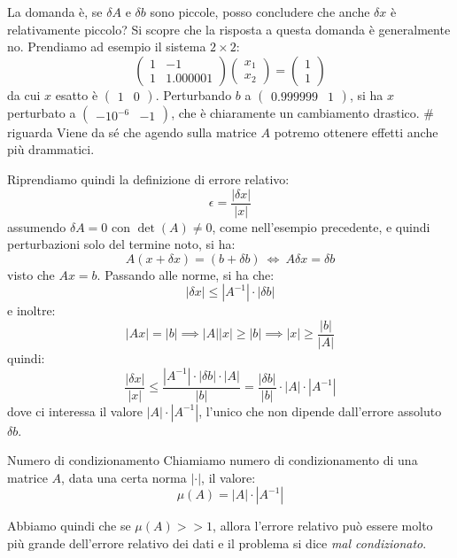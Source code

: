 \documentclass[a4paper,11pt]{article}
\begin{document}
La domanda è, se $\delta A$ e $\delta b$ sono piccole, posso concludere che anche $\delta x$ è relativamente piccolo?
Si scopre che la risposta a questa domanda è generalmente no.
Prendiamo ad esempio il sistema $2 \times 2$:
$$
\begin{pmatrix}
	1 & -1 \\
	1 & 1.000001
\end{pmatrix}
\begin{pmatrix}
	x_1 \\ x_2
\end{pmatrix}
=
\begin{pmatrix}
	1 \\ 1
\end{pmatrix}
$$
da cui $x$ esatto è $\begin{pmatrix}
	1 & 0
\end{pmatrix}$.
Perturbando $b$ a $\begin{pmatrix}
	0.999999 & 1
\end{pmatrix}$, si ha $x$ perturbato a $\begin{pmatrix}
	-10^{-6} & -1
\end{pmatrix}$, che è chiaramente un cambiamento drastico. # riguarda
Viene da sé che agendo sulla matrice $A$ potremo ottenere effetti anche più drammatici.

Riprendiamo quindi la definizione di errore relativo:
$$
\epsilon = \frac{|\delta x|}{|x|}
$$
assumendo $\delta A = 0$ con $\det(A) \neq 0$, come nell'esempio precedente, e quindi perturbazioni solo del termine noto, si ha:
$$
A (x + \delta x) = (b + \delta b) \ \Leftrightarrow \ A\delta x = \delta b
$$
visto che $Ax = b$. Passando alle norme, si ha che:
$$
| \delta x | \leq |A^{-1}| \cdot |\delta b|
$$
e inoltre:
$$
|Ax| = |b| \implies |A| |x| \geq |b| \implies |x| \geq \frac{|b|}{|A|}
$$
quindi:
$$
\frac{|\delta x|}{|x|} \leq \frac{|A^{-1}| \cdot |\delta b| \cdot |A|}{|b|} = \frac{|\delta b|}{|b|} \cdot |A| \cdot |A^{-1}|
$$
dove ci interessa il valore $|A| \cdot |A^{-1}|$, l'unico che non dipende dall'errore assoluto $\delta b$.
\begin{definition}{Numero di condizionamento}
	Chiamiamo numero di condizionamento di una matrice $A$, data una certa norma $|\cdot|$, il valore:
	$$
		\mu(A) = |A| \cdot |A^{-1}|
	$$
\end{definition}

Abbiamo quindi che se $\mu(A) >> 1$, allora l'errore relativo può essere molto più grande dell'errore relativo dei dati e il problema si dice \textit{mal condizionato}.
\end{document}
